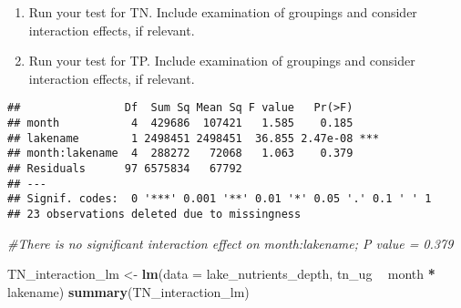 \documentclass[]{article}
\newenvironment{Shaded}{\begin{snugshade}}{\end{snugshade}}
\newcommand{\CommentTok}[1]{\textcolor[rgb]{0.56,0.35,0.01}{\textit{#1}}}
\newcommand{\DataTypeTok}[1]{\textcolor[rgb]{0.13,0.29,0.53}{#1}}
\newcommand{\KeywordTok}[1]{\textcolor[rgb]{0.13,0.29,0.53}{\textbf{#1}}}
\newcommand{\NormalTok}[1]{#1}
\newcommand{\OperatorTok}[1]{\textcolor[rgb]{0.81,0.36,0.00}{\textbf{#1}}}
\newcommand{\StringTok}[1]{\textcolor[rgb]{0.31,0.60,0.02}{#1}}
\begin{document}
\begin{enumerate}
\def\labelenumi{\arabic{enumi}.}
\setcounter{enumi}{4}
\item
  Run your test for TN. Include examination of groupings and consider
  interaction effects, if relevant.
\item
  Run your test for TP. Include examination of groupings and consider
  interaction effects, if relevant.
\end{enumerate}

\begin{Shaded}
\end{Shaded}

\begin{verbatim}
##                Df  Sum Sq Mean Sq F value   Pr(>F)    
## month           4  429686  107421   1.585    0.185    
## lakename        1 2498451 2498451  36.855 2.47e-08 ***
## month:lakename  4  288272   72068   1.063    0.379    
## Residuals      97 6575834   67792                     
## ---
## Signif. codes:  0 '***' 0.001 '**' 0.01 '*' 0.05 '.' 0.1 ' ' 1
## 23 observations deleted due to missingness
\end{verbatim}

\begin{Shaded}
\begin{Highlighting}[]
\CommentTok{#There is no significant interaction effect on month:lakename; P value = 0.379}

\NormalTok{TN_interaction_lm <-}\StringTok{ }\KeywordTok{lm}\NormalTok{(}\DataTypeTok{data =}\NormalTok{ lake_nutrients_depth, tn_ug }\OperatorTok{~}\StringTok{ }\NormalTok{month }\OperatorTok{*}\StringTok{ }\NormalTok{lakename)}
\KeywordTok{summary}\NormalTok{(TN_interaction_lm)}
\end{Highlighting}
\end{Shaded}
\end{document}
